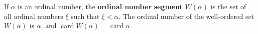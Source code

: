 If $\alpha$ is an ordinal number, the \textbf{ordinal number segment} $W(\alpha)$ is the set of all ordinal numbers $\xi$ such that $\xi < \alpha$. The ordinal number of the well-ordered set $W(\alpha)$ is $\alpha$, and $\operatorname{card} W(\alpha) = \operatorname{card} \alpha$.
